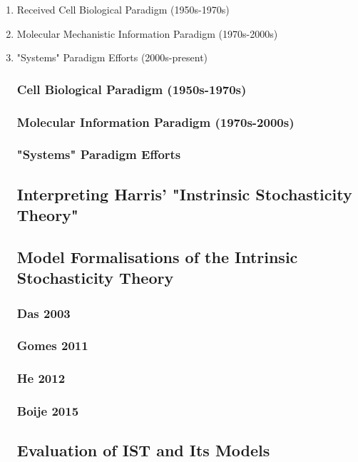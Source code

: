 \begin{enumerate}
\item Received Cell Biological Paradigm (1950s-1970s)
\item Molecular Mechanistic Information Paradigm (1970s-2000s)
\item "Systems" Paradigm Efforts (2000s-present)

\subsubsection{Cell Biological Paradigm (1950s-1970s)}

\subsubsection{Molecular Information Paradigm (1970s-2000s)}

\subsubsection{"Systems" Paradigm Efforts}

\subsection{Interpreting Harris' "Instrinsic Stochasticity Theory"}

\subsection{Model Formalisations of the Intrinsic Stochasticity Theory}
\subsubsection{Das 2003}
\subsubsection{Gomes 2011}
\subsubsection{He 2012}
\subsubsection{Boije 2015}

\subsection{Evaluation of IST and Its Models}

\end{enumerate}
